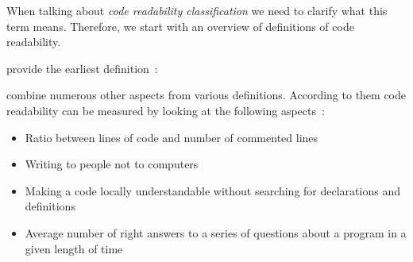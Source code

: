 \documentclass[%
class=scrreprt,
chapterprefix=false,%
open=right,%
twoside=false,%
paper=a4,%
logofile={Logo\_zentral\_farbig\_EN.png},%
thesistype=master,%
UKenglish,%
]{se2thesis}
\theoremstyle{definition}
\begin{document}
	
	When talking about \textit{code readability classification} we need to clarify what this term means. Therefore, we start with an overview of definitions of code readability.
	
	

	
	\citeauthor{buse2009learning} provide the earliest definition~\cite{buse2009learning}:

	\citeauthor{tashtoush2013impact} combine numerous other aspects from various definitions. According to them code readability can be measured by looking at the following aspects~\cite{tashtoush2013impact}:
	\begin{itemize}
		\item Ratio between lines of code and number of commented lines
		\item Writing to people not to computers
		\item Making a code locally understandable without searching for declarations and definitions
		\item Average number of right answers to a series of questions about a program in a given length of time
	\end{itemize}
	
\end{document}
